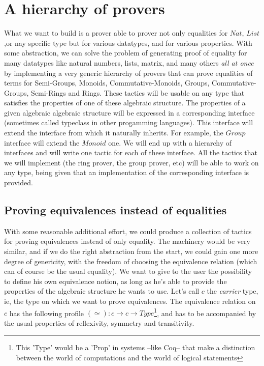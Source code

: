 \section{A hierarchy of provers}

What we want to build is a prover able to prover not only equalities for $Nat$, $List$,or nay specific type but for various datatypes, and for various properties. With some abstraction, we can solve the problem of generating proof of equality for many datatypes like natural numbers, lists, matrix, and many others \emph{all at once} by implementing a very generic hierarchy of provers that can prove equalities of terms for Semi-Groups, Monoids, Commutative-Monoids, Groups, Commutative-Groups, Semi-Rings and Rings. These tactics will be usable on any type that satisfies the properties of one of these algebraic structure. The properties of a given algebraic algebraic structure will be expressed in a corresponding interface (sometimes called typeclass in other progamming languages). This interface will extend the interface from which it naturally inherits. For example, the $Group$ interface will extend the $Monoid$ one. We will end up with a hierarchy of interfaces and will write one tactic for each of these interface. All the tactics that we will implement (the ring prover, the group prover, etc) will be able to work on any type, being given that an implementation of the corresponding interface is provided.

	\subsection{Proving equivalences instead of equalities}
	
With some reasonable additional effort, we could produce a collection of tactics for proving equivalences instead of only equality. The machinery would be very similar, and if we do the right abstraction from the start, we could gain one more degree of genericity, with the freedom of choosing the equivalence relation (which can of course be the usual equality). We want to give to the user the possibility to define his own equivalence notion, as long as he's able to provide the properties of the algebraic structure he wants to use. Let's call $c$ the \emph{carrier} type, ie, the type on which we want to prove equivalences. The equivalence relation on $c$ has the following profile $(\simeq) : c \rightarrow c \rightarrow Type$\footnote{This 'Type' would be a 'Prop' in systems --like Coq-- that make a distinction between the world of computations and the world of logical statements}, and has to be accompanied by the usual properties of reflexivity, symmetry and transitivity.

